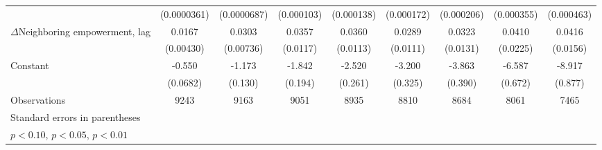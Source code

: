 \begin{table}[htbp]
\begin{tabular}{l*{8}{c}}
                    & (0.0000361)         & (0.0000687)         &  (0.000103)         &  (0.000138)         &  (0.000172)         &  (0.000206)         &  (0.000355)         &  (0.000463)         \\
[1em]
$\Delta$Neighboring empowerment, lag&      0.0167\sym{***}&      0.0303\sym{***}&      0.0357\sym{***}&      0.0360\sym{***}&      0.0289\sym{**} &      0.0323\sym{**} &      0.0410\sym{*}  &      0.0416\sym{***}\\
                    &   (0.00430)         &   (0.00736)         &    (0.0117)         &    (0.0113)         &    (0.0111)         &    (0.0131)         &    (0.0225)         &    (0.0156)         \\
[1em]
Constant            &      -0.550\sym{***}&      -1.173\sym{***}&      -1.842\sym{***}&      -2.520\sym{***}&      -3.200\sym{***}&      -3.863\sym{***}&      -6.587\sym{***}&      -8.917\sym{***}\\
                    &    (0.0682)         &     (0.130)         &     (0.194)         &     (0.261)         &     (0.325)         &     (0.390)         &     (0.672)         &     (0.877)         \\
\hline
Observations        &        9243         &        9163         &        9051         &        8935         &        8810         &        8684         &        8061         &        7465         \\
\hline\hline
\multicolumn{9}{l}{\footnotesize Standard errors in parentheses}\\
\multicolumn{9}{l}{\footnotesize \sym{*} \(p<0.10\), \sym{**} \(p<0.05\), \sym{***} \(p<0.01\)}\\
\end{tabular}
\end{table}
